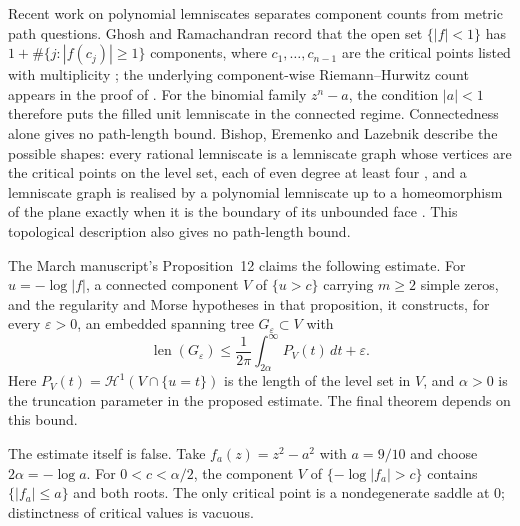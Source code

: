 \documentclass[11pt]{article}
\begin{document}
Recent work on polynomial lemniscates separates component counts from metric
path questions. Ghosh and Ramachandran record that the open set
$\{|f|<1\}$ has $1+\#\{j:|f(c_j)|\ge1\}$ components, where
$c_1,\ldots,c_{n-1}$ are the critical points listed with multiplicity
\cite[Lemma~2.5]{ghosh2023}; the underlying component-wise Riemann--Hurwitz
count appears in the proof of \cite[Proposition~2.1]{eks2010}.  For the
binomial family $z^n-a$, the condition $|a|<1$ therefore puts the filled unit
lemniscate in the connected regime. Connectedness alone gives no path-length bound.
Bishop, Eremenko and Lazebnik describe the possible shapes: every rational
lemniscate is a lemniscate graph whose vertices are the critical points on the
level set, each of even degree at least four
\cite[Definition~1.2 and Proposition~2.4]{bishoperemenkolazebnik2025}, and a
lemniscate graph is realised by a polynomial lemniscate up to a homeomorphism
of the plane exactly when it is the boundary of its unbounded face
\cite[Corollary~1.6]{bishoperemenkolazebnik2025}.  This topological
description also gives no path-length bound.

The March manuscript's Proposition~12 claims the following
estimate.  For $u=-\log|f|$, a connected component $V$ of $\{u>c\}$ carrying
$m\ge2$ simple zeros, and the regularity and Morse hypotheses in that proposition, it
constructs, for every $\varepsilon>0$, an embedded spanning tree
$G_\varepsilon\subset V$ with
\[
 \operatorname{len}(G_\varepsilon)
 \le\frac1{2\pi}\int_{2\alpha}^{\infty}P_V(t)\,dt+\varepsilon.
\tag{5.1}\label{eq:prop12-bound}
\]
Here $P_V(t)=\mathcal H^1(V\cap\{u=t\})$ is the length of the level
set in $V$, and $\alpha>0$ is the truncation parameter in the proposed
estimate. The final theorem depends on this bound.

The estimate itself is false. Take $f_a(z)=z^2-a^2$ with $a=9/10$
and choose $2\alpha=-\log a$. For $0<c<\alpha/2$, the component
$V$ of $\{-\log|f_a|>c\}$ contains $\{|f_a|\le a\}$ and both roots.
The only critical point is a nondegenerate saddle at $0$; distinctness
of critical values is vacuous.
\end{document}
